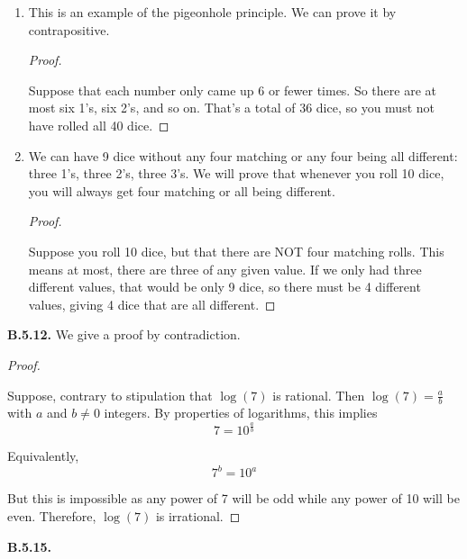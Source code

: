\documentclass[10pt,]{book}
\theoremstyle{plain}
\theoremstyle{definition}
\theoremstyle{definition}
\theoremstyle{definition}
\theoremstyle{definition}
\numberwithin{equation}{chapter}
\begin{document}
\begin{enumerate}[label=(\alph*)]
\item\hypertarget{li-712}{}\hypertarget{p-2057}{}%
This is an example of the pigeonhole principle. We can prove it by contrapositive.%
\begin{proof}\hypertarget{proof-34}{}
\hypertarget{p-2058}{}%
Suppose that each number only came up 6 or fewer times. So there are at most six 1's, six 2's, and so on. That's a total of 36 dice, so you must not have rolled all 40 dice.%
\end{proof}
\item\hypertarget{li-713}{}\hypertarget{p-2059}{}%
We can have 9 dice without any four matching or any four being all different: three 1's, three 2's, three 3's. We will prove that whenever you roll 10 dice, you will always get four matching or all being different.%
\begin{proof}\hypertarget{proof-35}{}
\hypertarget{p-2060}{}%
Suppose you roll 10 dice, but that there are NOT four matching rolls. This means at most, there are three of any given value. If we only had three different values, that would be only 9 dice, so there must be 4 different values, giving 4 dice that are all different.%
\end{proof}
\end{enumerate}
%
\par\smallskip
\noindent\textbf{B.5.12.} \hypertarget{p-2062}{}%
We give a proof by contradiction.%
\begin{proof}\hypertarget{proof-36}{}
\hypertarget{p-2063}{}%
Suppose, contrary to stipulation that \(\log(7)\) is rational. Then \(\log(7) = \frac{a}{b}\) with \(a\) and \(b \ne 0\) integers. By properties of logarithms, this implies%
\begin{equation*}
7 = 10^{\frac{a}{b}}
\end{equation*}
%
\par
\hypertarget{p-2064}{}%
Equivalently,%
\begin{equation*}
7^b = 10^a
\end{equation*}
%
\par
\hypertarget{p-2065}{}%
But this is impossible as any power of 7 will be odd while any power of 10 will be even.  Therefore, \(\log(7)\) is irrational.%
\end{proof}
\par\smallskip
\noindent\textbf{B.5.15.} \hypertarget{p-2074}{}%
\leavevmode%
\end{document}
